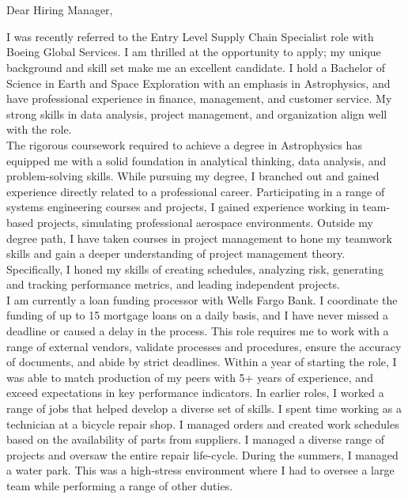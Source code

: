 \section{}




\bigskip

Dear Hiring Manager,

\bigskip
\bigskip


\hspace{1cm}I was recently referred to the Entry Level Supply Chain Specialist role with Boeing Global Services. I am thrilled at the opportunity to apply; my unique background and skill set make me an excellent candidate. I hold a Bachelor of Science in Earth and Space Exploration with an emphasis in Astrophysics, and have professional experience in finance, management, and customer service. My strong skills in data analysis, project management, and organization align well with the role. \\
\medskip
\hspace{1cm}The rigorous coursework required to achieve a degree in Astrophysics has equipped me with a solid foundation in analytical thinking, data analysis, and problem-solving skills. While pursuing my degree, I branched out and gained experience directly related to a professional career. Participating in a range of systems engineering courses and projects, I gained experience working in team-based projects, simulating professional aerospace environments. Outside my degree path, I have taken courses in project management to hone my teamwork skills and gain a deeper understanding of project management theory. Specifically, I honed my skills of creating schedules, analyzing risk, generating and tracking performance metrics, and leading independent projects. \\
\medskip
\hspace{1cm}I am currently a loan funding processor with Wells Fargo Bank. I coordinate the funding of up to 15 mortgage loans on a daily basis, and I have never missed a deadline or caused a delay in the process. This role requires me to work with a range of external vendors, validate processes and procedures, ensure the accuracy of documents, and abide by strict deadlines. Within a year of starting the role, I was able to match production of my peers with 5+ years of experience, and exceed expectations in key performance indicators. In earlier roles, I worked a range of jobs that helped develop a diverse set of skills. I spent time working as a technician at a bicycle repair shop. I managed orders and created work schedules based on the availability of parts from suppliers. I managed a diverse range of projects and oversaw the entire repair life-cycle. During the summers, I managed a water park. This was a high-stress environment where I had to oversee a large team while performing a range of other duties. \\
